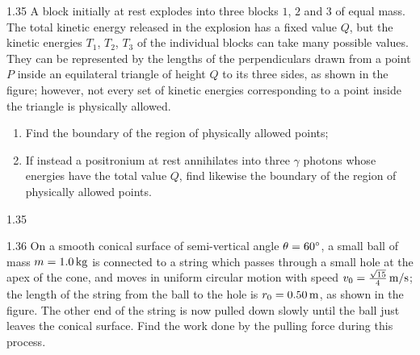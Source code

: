 \begin{problem}{1.35}
A block initially at rest explodes into three blocks $1$, $2$ and $3$ of equal mass. The total kinetic energy released in the explosion has a fixed value $Q$, but the kinetic energies $T_1$, $T_2$, $T_3$ of the individual blocks can take many possible values. They can be represented by the lengths of the perpendiculars drawn from a point $P$ inside an equilateral triangle of height $Q$ to its three sides, as shown in the figure; however, not every set of kinetic energies corresponding to a point inside the triangle is physically allowed.
\begin{enumerate}[label=(\arabic*),leftmargin=2.2em,itemsep=1pt,topsep=2pt]
\item Find the boundary of the region of physically allowed points;
\item If instead a positronium at rest annihilates into three $\gamma$ photons whose energies have the total value $Q$, find likewise the boundary of the region of physically allowed points.
\end{enumerate}
\end{problem}

\begin{figbox}{1.35}
\end{figbox}

\begin{problem}{1.36}
On a smooth conical surface of semi-vertical angle $\theta=60^{\circ}$, a small ball of mass $m=1.0\,\mathrm{kg}$ is connected to a string which passes through a small hole at the apex of the cone, and moves in uniform circular motion with speed $v_0=\frac{\sqrt{15}}{4}\,\mathrm{m/s}$; the length of the string from the ball to the hole is $r_0=0.50\,\mathrm{m}$, as shown in the figure. The other end of the string is now pulled down slowly until the ball just leaves the conical surface. Find the work done by the pulling force during this process.
\end{problem}

